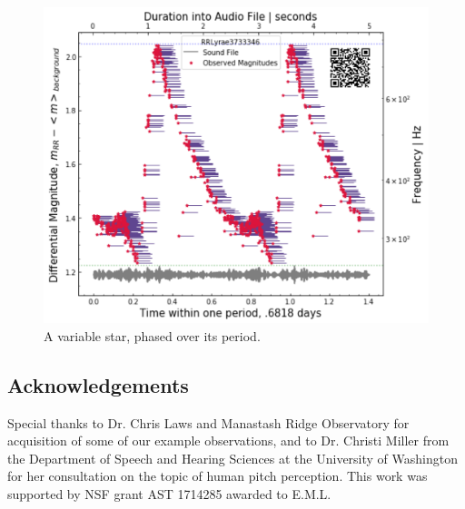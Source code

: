 \documentclass[]{acmsiggraph}
\begin{document}
\begin{figure}
\centering
\includegraphics[width=.7\linewidth]{paper/images/RRLyrae.png}
\caption{A variable star, phased over its period.}
\label{fig:RRLyrae}
\end{figure}

\subsection{Acknowledgements}
Special thanks to Dr. Chris Laws and Manastash Ridge Observatory for acquisition of some of our example observations, and to Dr. Christi Miller from the Department of Speech and Hearing Sciences at the University of Washington for her consultation on the topic of human pitch perception. This work was supported by NSF grant AST 1714285 awarded to E.M.L.
\end{document}
